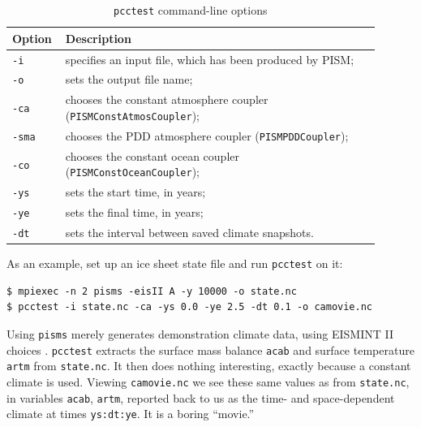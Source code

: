 \documentclass[11pt,final]{amsart}
\begin{document}
\begin{table}[h]
  \caption{\texttt{pcctest} command-line options}
  \centering
  \begin{tabular}{p{0.1\linewidth}p{0.8\linewidth}}\hline
    \textbf{Option} & \textbf{Description}\\
    \hline
    \texttt{-i} & specifies an input file, which has been produced by PISM;\\
    \texttt{-o} & sets the output file name;\\
    \texttt{-ca} &chooses the constant atmosphere coupler (\verb|PISMConstAtmosCoupler|);\\
    \texttt{-sma} & chooses the PDD atmosphere coupler (\verb|PISMPDDCoupler|);\\
    \texttt{-co} & chooses the constant ocean coupler (\verb|PISMConstOceanCoupler|);\\
    \texttt{-ys} & sets the start time, in years;\\
    \texttt{-ye} & sets the final time, in years;\\
    \texttt{-dt} & sets the interval between saved climate snapshots.\\
    \hline
 \end{tabular}
 \label{tab:pcctest}
\end{table}

\bigskip
As an example, set up an ice sheet state file and run \verb|pcctest| on it:
\begin{verbatim}
$ mpiexec -n 2 pisms -eisII A -y 10000 -o state.nc
$ pcctest -i state.nc -ca -ys 0.0 -ye 2.5 -dt 0.1 -o camovie.nc
\end{verbatim}
Using \verb|pisms| merely generates demonstration climate data, using
EISMINT II choices \cite{EISMINT00}.  \verb|pcctest| extracts the 
surface mass balance \verb|acab| and surface temperature \verb|artm| from \verb|state.nc|.
It then does nothing interesting, exactly because a constant climate
is used.  Viewing \verb|camovie.nc| we see these same values as from \verb|state.nc|,
in variables \verb|acab|, \verb|artm|, reported back to us as the time- and space-dependent
climate at times \verb|ys:dt:ye|.  It is a boring ``movie.''
\end{document}
